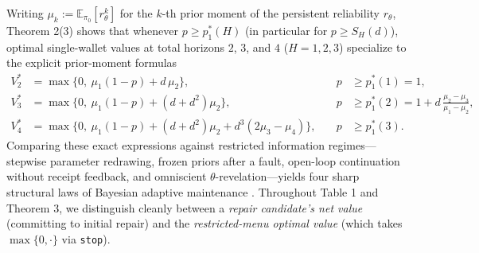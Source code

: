 \documentclass[11pt,letterpaper]{article}
\begin{document}
Writing \(\mu_k := \mathbb{E}_{\pi_0}[r_\theta^k]\) for the \(k\)-th
prior moment of the persistent reliability \(r_\theta\), Theorem 2(3)
shows that whenever \(p \ge p_1^*(H)\) (in particular for
\(p \ge S_H(d)\)), optimal single-wallet values at total horizons \(2\),
\(3\), and \(4\) (\(H = 1, 2, 3\)) specialize to the explicit
prior-moment formulas \[\begin{aligned}
V_2^* &= \max\bigl\{0,\ \mu_1(1 - p) + d\,\mu_2\bigr\}, &\quad p &\ge p_1^*(1) = 1, \\
V_3^* &= \max\bigl\{0,\ \mu_1(1 - p) + (d + d^2)\mu_2\bigr\}, &\quad p &\ge p_1^*(2) = 1 + d\,\frac{\mu_2 - \mu_3}{\mu_1 - \mu_2}, \\
V_4^* &= \max\bigl\{0,\ \mu_1(1 - p) + (d + d^2)\mu_2 + d^3(2\mu_3 - \mu_4)\bigr\}, &\quad p &\ge p_1^*(3).
\end{aligned}\] Comparing these exact expressions against restricted
information regimes---stepwise parameter redrawing, frozen priors after
a fault, open-loop continuation without receipt feedback, and omniscient
\(\theta\)-revelation---yields four sharp structural laws of Bayesian
adaptive maintenance
\citep{blackwell1953, howard1966, easleyKiefer1988, aghion1991, ross2011}.
Throughout Table 1 and Theorem 3, we distinguish cleanly between a
\emph{repair candidate's net value} (committing to initial repair) and
the \emph{restricted-menu optimal value} (which takes
\(\max\{0, \cdot\}\) via \texttt{stop}).

\end{document}
